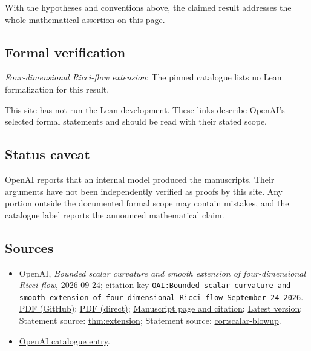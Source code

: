 \documentclass[11pt]{article}
\begin{document}
With the hypotheses and conventions above, the claimed result addresses the whole mathematical assertion on this page.

\subsection{Formal verification}
\textit{Four-dimensional Ricci-flow extension}: The pinned catalogue lists no Lean formalization for this result.

This site has not run the Lean development. These links describe OpenAI’s selected formal statements and should be read with their stated scope.

\subsection{Status caveat}
OpenAI reports that an internal model produced the manuscripts. Their arguments have not been independently verified as proofs by this site. Any portion outside the documented formal scope may contain mistakes, and the catalogue label reports the announced mathematical claim.

\subsection{Sources}
\begin{itemize}
\item OpenAI, \emph{Bounded scalar curvature and smooth extension of four-dimensional Ricci flow}, 2026-09-24; citation key \texttt{OAI:Bounded-scalar-curvature-and-smooth-extension-of-four-dimensional-Ricci-flow-September-24-2026}. \href{https://github.com/openai/math/blob/adc7f1241b42e322a6451854ab7e4b4c146bf78a/preprints/Bounded-scalar-curvature-and-smooth-extension-of-four-dimensional-Ricci-flow-September-24-2026/paper.pdf}{PDF (GitHub)}; \href{https://github.com/openai/math/raw/adc7f1241b42e322a6451854ab7e4b4c146bf78a/preprints/Bounded-scalar-curvature-and-smooth-extension-of-four-dimensional-Ricci-flow-September-24-2026/paper.pdf}{PDF (direct)}; \href{https://github.com/openai/math/blob/adc7f1241b42e322a6451854ab7e4b4c146bf78a/preprints/Bounded-scalar-curvature-and-smooth-extension-of-four-dimensional-Ricci-flow-September-24-2026/README.md}{Manuscript page and citation}; \href{https://github.com/openai/math/blob/main/preprints/Bounded-scalar-curvature-and-smooth-extension-of-four-dimensional-Ricci-flow-September-24-2026/paper.pdf}{Latest version}; Statement source: \href{https://github.com/openai/math/blob/adc7f1241b42e322a6451854ab7e4b4c146bf78a/preprints/Bounded-scalar-curvature-and-smooth-extension-of-four-dimensional-Ricci-flow-September-24-2026/build/sections/01-introduction.tex\#L11}{thm:extension}; Statement source: \href{https://github.com/openai/math/blob/adc7f1241b42e322a6451854ab7e4b4c146bf78a/preprints/Bounded-scalar-curvature-and-smooth-extension-of-four-dimensional-Ricci-flow-September-24-2026/build/sections/01-introduction.tex\#L31}{cor:scalar-blowup}.
\item \href{https://github.com/openai/math/blob/adc7f1241b42e322a6451854ab7e4b4c146bf78a/CONTENTS.md}{OpenAI catalogue entry}.
\end{itemize}
\end{document}
